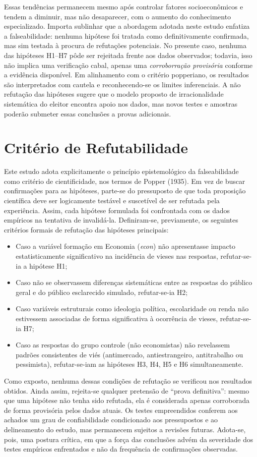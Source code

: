 Essas tendências permanecem mesmo após controlar fatores socioeconômicos e tendem a diminuir, mas não desaparecer, com o aumento do conhecimento especializado. Importa sublinhar que a abordagem adotada neste estudo enfatiza a falseabilidade: nenhuma hipótese foi tratada como definitivamente confirmada, mas sim testada à procura de refutações potenciais. No presente caso, nenhuma das hipóteses H1–H7 pôde ser rejeitada frente aos dados observados; todavia, isso não implica uma verificação cabal, apenas uma \emph{corroborração provisória} conforme a evidência disponível. Em alinhamento com o critério popperiano, os resultados são interpretados com cautela e reconhecendo-se os limites inferenciais. A não refutação das hipóteses sugere que o modelo proposto de irracionalidade sistemática do eleitor encontra apoio nos dados, mas novos testes e amostras poderão submeter essas conclusões a provas adicionais. 

\section{Critério de Refutabilidade} Este estudo adota explicitamente o princípio epistemológico da falseabilidade como critério de cientificidade, nos termos de Popper (1935). Em vez de buscar confirmações para as hipóteses, parte-se do pressuposto de que toda proposição científica deve ser logicamente testável e suscetível de ser refutada pela experiência. Assim, cada hipótese formulada foi confrontada com os dados empíricos na tentativa de invalidá-la. Definiram-se, previamente, os seguintes critérios formais de refutação das hipóteses principais: \begin{itemize}
	\item Caso a variável formação em Economia (\textit{econ}) não apresentasse impacto estatisticamente significativo na incidência de vieses nas respostas, refutar-se-ia a hipótese H1;
	\item Caso não se observassem diferenças sistemáticas entre as respostas do público geral e do público esclarecido simulado, refutar-se-ia H2;
	\item Caso variáveis estruturais como ideologia política, escolaridade ou renda não estivessem associadas de forma significativa à ocorrência de vieses, refutar-se-ia H7;
	\item Caso as respostas do grupo controle (não economistas) não revelassem padrões consistentes de viés (antimercado, antiestrangeiro, antitrabalho ou pessimista), refutar-se-iam as hipóteses H3, H4, H5 e H6 simultaneamente.
\end{itemize} Como exposto, nenhuma dessas condições de refutação se verificou nos resultados obtidos. Ainda assim, rejeita-se qualquer pretensão de ``prova definitiva'': mesmo que uma hipótese não tenha sido refutada, ela é considerada apenas corroborada de forma provisória pelos dados atuais. Os testes empreendidos conferem aos achados um grau de confiabilidade condicionado aos pressupostos e ao delineamento do estudo, mas permanecem sujeitos a revisões futuras. Adota-se, pois, uma postura crítica, em que a força das conclusões advém da severidade dos testes empíricos enfrentados e não da frequência de confirmações observadas. 

